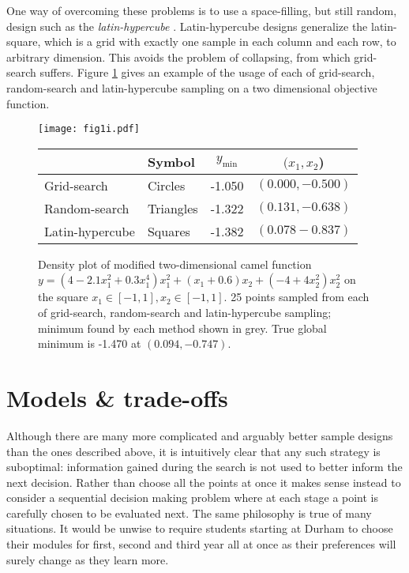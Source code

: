 One way of overcoming these problems is to use a space-filling, but still random, design such as the \textit{latin-hypercube} \cite{lectures}. Latin-hypercube designs generalize the latin-square, which is a grid with exactly one sample in each column and each row, to arbitrary dimension. This avoids the problem of collapsing, from which grid-search suffers. Figure \ref{fig:1i} gives an example of the usage of each of grid-search, random-search and latin-hypercube sampling on a two dimensional objective function. 

\begin{figure}
\centering
\texttt{[image: fig1i.pdf]}
\begin{tabular}{ l | l c c }
              & Symbol & $y_{\mathrm{min}}$ & $(x_1, x_2$)\\ \hline
  Grid-search & Circles & -1.050 & $(0.000, -0.500)$\\
  Random-search & Triangles & -1.322 & $(0.131, -0.638)$\\
  Latin-hypercube & Squares & -1.382 & $(0.078 -0.837)$\\
\end{tabular}
\caption[width=\linewidth]{Density plot of modified two-dimensional camel function $y = (4 - 2.1x_1^2 + 0.3x_1^4)x_1^2 + (x_1+0.6)x_2 + (-4+4x_2^2)x_2^2$ on the square $x_1 \in [-1,1], x_2 \in [-1,1]$. 25 points sampled from each of grid-search, random-search and latin-hypercube sampling; minimum found by each method shown in grey. True global minimum is -1.470 at $(0.094, -0.747)$.} \label{fig:1i} 
\end{figure}

\section{Models \& trade-offs}

Although there are many more complicated and arguably better sample designs than the ones described above, it is intuitively clear that any such strategy is suboptimal: information gained during the search is not used to better inform the next decision. Rather than choose all the points at once it makes sense instead to consider a sequential decision making problem where at each stage a point is carefully chosen to be evaluated next. The same philosophy is true of many situations. It would be unwise to require students starting at Durham to choose their modules for first, second and third year all at once as their preferences will surely change as they learn more.

